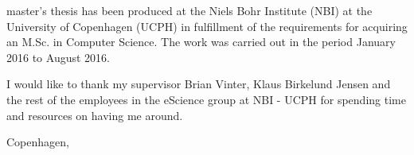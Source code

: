 master's thesis has been produced at the Niels Bohr Institute (NBI) at the University of Copenhagen (UCPH) in fulfillment of the requirements for acquiring an M.Sc. in Computer Science. The work was carried out in the period January 2016 to August 2016.
\newline

I would like to thank my supervisor Brian Vinter, Klaus Birkelund Jensen and the rest of the employees in the eScience group at NBI - UCPH for spending time and resources on having me around.

\vspace{10mm}
\begin{center}
	\hspace{20mm} Copenhagen, \HandinDate 
	\vspace{5mm}
	\newline
\end{center}
\begin{flushright}
	\FullName
\end{flushright}